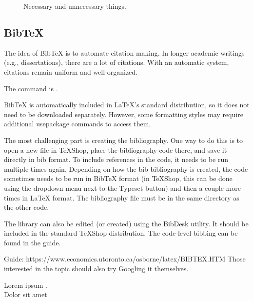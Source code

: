 \documentclass[12pt, titlepage, a4paper]{article}  %
\begin{document}
\begin{figure}[h!]
\begin{center}
\end{center}
\caption{Necessary and unnecessary things.}
\end{figure}

\subsection{BibTeX}

The idea of BibTeX is to automate citation making. In longer academic writings (e.g., dissertations), there are a lot of citations. With an automatic system, citations remain uniform and well-organized.

The command is \cite{referenceID}. \cite{bar}

BibTeX is automatically included in \LaTeX's standard distribution, so it does not need to be downloaded separately. However, some formatting styles may require additional usepackage commands to access them.

The most challenging part is creating the bibliography. One way to do this is to open a new file in TeXShop, place the bibliography code there, and save it directly in bib format. To include references in the code, it needs to be run multiple times again. Depending on how the bib bibliography is created, the code sometimes needs to be run in BibTeX format (in TeXShop, this can be done using the dropdown menu next to the Typeset button) and then a couple more times in LaTeX format. The bibliography file must be in the same directory as the other code.

The library can also be edited (or created) using the BibDesk utility. It should be included in the standard TeXShop distribution. The code-level bibbing can be found in the guide.

Guide: https://www.economics.utoronto.ca/osborne/latex/BIBTEX.HTM  
Those interested in the topic should also try Googling it themselves.

Lorem ipsum \cite{ahu61}. \\ %
Dolor sit amet \cite[p. 2]{bar}  %

\end{document}

